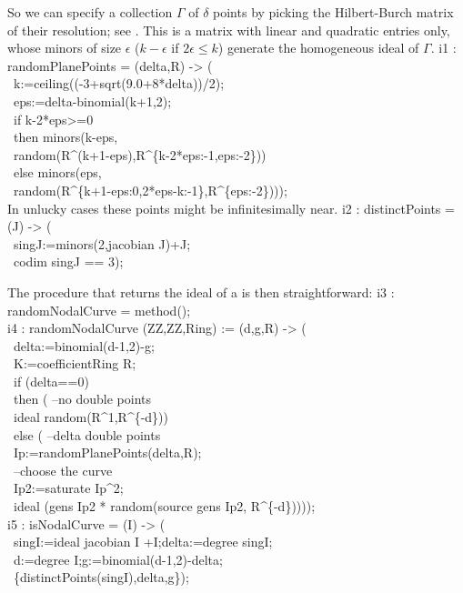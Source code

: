 \noindent
So we can specify a collection $\Gamma$ of $\delta$ points by picking 
the Hilbert-Burch matrix of their resolution; see \cite[Thm 20.15]{CO:Ei}. 
This is a matrix with linear and quadratic entries only, 
whose minors of size $\epsilon$ ($k-\epsilon$ if $2\epsilon\leq k$) 
generate the homogeneous ideal of $\Gamma$.
\beginOutput
i1 : randomPlanePoints = (delta,R) -> (\\
\          k:=ceiling((-3+sqrt(9.0+8*delta))/2);\\
\          eps:=delta-binomial(k+1,2);\\
\          if k-2*eps>=0 \\
\          then minors(k-eps,\\
\               random(R^(k+1-eps),R^\{k-2*eps:-1,eps:-2\}))\\
\          else minors(eps,\\
\               random(R^\{k+1-eps:0,2*eps-k:-1\},R^\{eps:-2\})));\\
\endOutput
In unlucky cases these points might be infinitesimally near.
\beginOutput
i2 : distinctPoints = (J) -> (\\
\          singJ:=minors(2,jacobian J)+J;\\
\          codim singJ == 3);\\
\endOutput

\medskip \noindent
The procedure that returns the ideal of a  is then straightforward: 
\beginOutput
i3 : randomNodalCurve = method();\\
\endOutput
\beginOutput
i4 : randomNodalCurve (ZZ,ZZ,Ring) := (d,g,R) -> (\\
\          delta:=binomial(d-1,2)-g;\\
\          K:=coefficientRing R;\\
\          if (delta==0) \\
\          then (     --no double points\\
\               ideal random(R^1,R^\{-d\}))\\
\          else (      --delta double points            \\
\               Ip:=randomPlanePoints(delta,R);\\
\               --choose the curve\\
\               Ip2:=saturate Ip^2;\\
\               ideal (gens Ip2 * random(source gens Ip2, R^\{-d\}))));\\
\endOutput
\beginOutput
i5 : isNodalCurve = (I) -> (\\
\          singI:=ideal jacobian I +I;delta:=degree singI;\\
\          d:=degree I;g:=binomial(d-1,2)-delta;\\
\          \{distinctPoints(singI),delta,g\});\\
\endOutput

